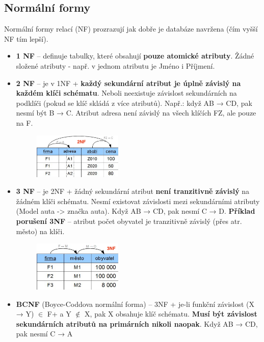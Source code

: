 \subsection{Normální formy}
Normální formy relací (NF) prozrazují jak dobře je databáze navržena (čím vyšší NF tím lepší).
\begin{itemize}
\item \textbf{1 NF} -- definuje tabulky, které obsahují \textbf{pouze atomické atributy}. Žádné složené atributy - např. v jednom atributu je Jméno i Příjmení.
\item \textbf{2 NF} -- je v 1NF + \textbf{každý sekundární atribut je úplně závislý na každém klíči schématu}. Neboli neexistuje závislost sekundárních na podklíči (pokud se klíč skládá z více atributů). Např.: když AB → CD, pak nesmí být B → C. Atribut adresa není závislý na všech klíčích FZ, ale pouze na F.
\begin{figure}[H]
	\centering
	\includegraphics[width=0.4\textwidth]{assets/2nf.png}
\end{figure}
\item \textbf{3 NF} -- je 2NF + žádný sekundární atribut \textbf{není tranzitivně závislý} na žádném klíči schématu. Nesmí existovat závislosti mezi sekundárními atributy (Model auta -> značka auta). Když AB → CD, pak nesmí C  → D. \textbf{Příklad porušení 3NF} -- atribut počet obyvatel je tranzitivně závislý (přes atr. město) na klíči.
\begin{figure}[H]
	\centering
	\includegraphics[width=0.4\textwidth]{assets/3nf.png}
\end{figure}
\item \textbf{BCNF} (Boyce-Coddova normální forma) -- 3NF + je-li funkční závislost (X → Y) $\in$ F+ a Y $\notin$ X, pak X obsahuje klíč schématu. \textbf{Musí být závislost sekundárních atributů na primárních nikoli naopak}. Když AB → CD, pak nesmí C  → A  
\end{itemize}